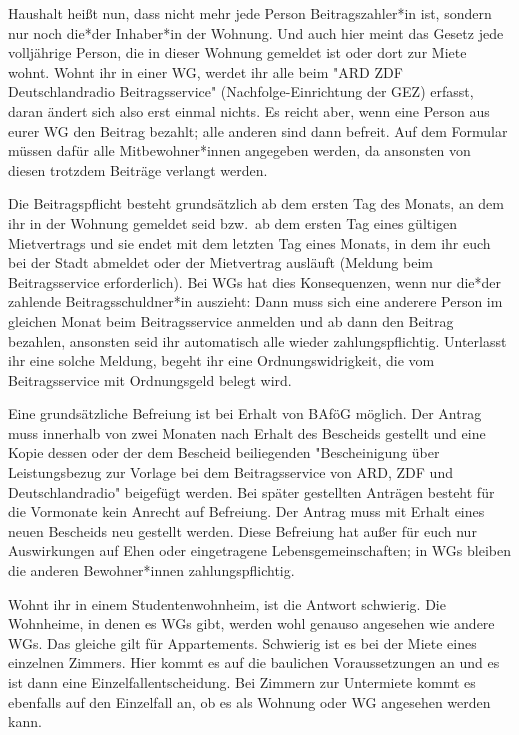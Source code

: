 \begin{multicols*}{2}
Haushalt heißt nun, dass nicht mehr jede Person Beitragszahler*in ist, sondern nur noch die*der Inhaber*in der Wohnung.
Und auch hier meint das Gesetz jede volljährige Person, die in dieser Wohnung gemeldet ist oder dort zur Miete wohnt.
Wohnt ihr in einer WG, werdet ihr alle beim "ARD ZDF Deutschlandradio Beitragsservice" (Nachfolge-Einrichtung der GEZ) erfasst, daran ändert sich also erst einmal nichts.
Es reicht aber, wenn eine Person aus eurer WG den Beitrag bezahlt; alle anderen sind dann befreit.
Auf dem Formular müssen dafür alle Mitbewohner*innen angegeben werden, da ansonsten von diesen trotzdem Beiträge verlangt werden.

Die Beitragspflicht besteht grundsätzlich ab dem ersten Tag des Monats, an dem ihr in der Wohnung gemeldet seid bzw.\ ab dem ersten Tag eines gültigen Mietvertrags und sie endet mit dem letzten Tag eines Monats, in dem ihr euch bei der Stadt abmeldet oder der Mietvertrag ausläuft (Meldung beim Beitragsservice erforderlich).
Bei WGs hat dies Konsequenzen, wenn nur die*der zahlende Beitragsschuldner*in auszieht: Dann muss sich eine anderere Person im gleichen Monat beim Beitragsservice anmelden und ab dann den Beitrag bezahlen, ansonsten seid ihr automatisch alle wieder zahlungspflichtig.
Unterlasst ihr eine solche Meldung, begeht ihr eine Ordnungswidrigkeit, die vom Beitragsservice mit Ordnungsgeld belegt wird.

Eine grundsätzliche Befreiung ist bei Erhalt von BAföG möglich.
Der Antrag muss innerhalb von zwei Monaten nach Erhalt des Bescheids gestellt und eine Kopie dessen oder der dem Bescheid beiliegenden "Bescheinigung über Leistungsbezug zur Vorlage bei dem Beitragsservice von ARD, ZDF und Deutschlandradio" beigefügt werden.
Bei später gestellten Anträgen besteht für die Vormonate kein Anrecht auf Befreiung.
Der Antrag muss mit Erhalt eines neuen Bescheids neu gestellt werden.
Diese Befreiung hat außer für euch nur Auswirkungen auf Ehen oder eingetragene Lebensgemeinschaften; in WGs bleiben die anderen Bewohner*innen zahlungspflichtig.

Wohnt ihr in einem Studentenwohnheim, ist die Antwort schwierig.
Die Wohnheime, in denen es WGs gibt, werden wohl genauso angesehen wie andere WGs.
Das gleiche gilt für Appartements.
Schwierig ist es bei der Miete eines einzelnen Zimmers.
Hier kommt es auf die baulichen Voraussetzungen an und es ist dann eine Einzelfallentscheidung.
Bei Zimmern zur Untermiete kommt es ebenfalls auf den Einzelfall an, ob es als Wohnung oder WG angesehen werden kann.


\end{multicols*}
